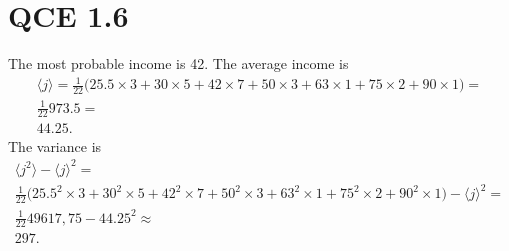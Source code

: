\documentclass[10pt]{article}
\begin{document}
\section*{QCE 1.6}
The most probable income is 42. The average income is 
\begin{align*}
\langle j \rangle = \frac{1}{22} \Bigg( 25.5 \times 3 + 30 \times 5 + 42 \times 7 + 50 \times 3 + 63 \times 1 + 75 \times 2 + 90 \times 1 \Bigg)  = \\
\frac{1}{22} 973.5 = \\
44.25.
\end{align*}
The variance is
\begin{align*}
\langle j^2 \rangle - \langle j \rangle^2 = \\
\frac{1}{22} \Bigg( 25.5^2 \times 3 + 30^2 \times 5 + 42^2 \times 7 + 50^2 \times 3 + 63^2 \times 1 + 75^2 \times 2 + 90^2 \times 1 \Bigg) - \langle j \rangle^2 = \\
\frac{1}{22} 49 617,75 - 44.25^2 \approx \\
297.
\end{align*}
\end{document}
